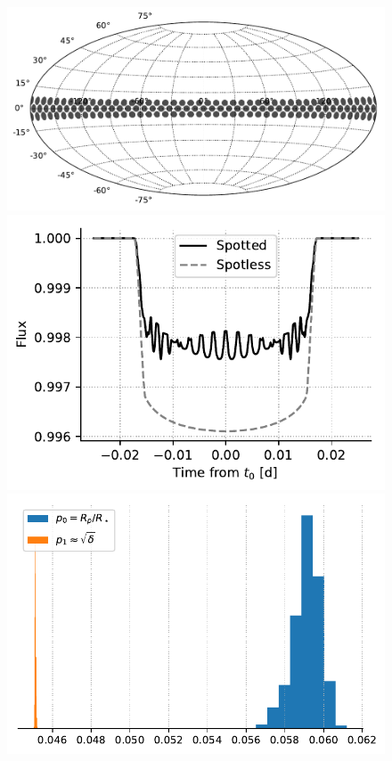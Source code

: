 \begin{subappendices}
\begin{figure}
    \centering
    \includegraphics[scale=0.5]{robin/spot_map_4.pdf}
    \includegraphics[scale=0.6]{robin/transit_quad_4.pdf}
    \includegraphics[scale=0.7]{robin/rms4_agreement.pdf}

\end{figure}
\end{subappendices}
